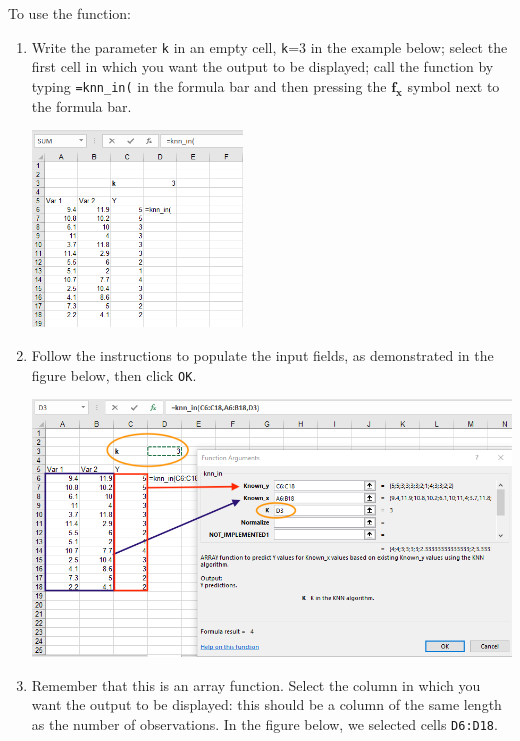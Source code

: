 \documentclass[12pt]{article}
\begin{document}
To use the function:
\begin{enumerate}
\item Write the parameter \texttt{k} in an empty cell, \texttt{k}=3 in the example below; select the first cell in which you want the output to be displayed; call the function by typing \texttt{=knn\_in(} in the formula bar and then pressing the $\boldsymbol{f_x}$ symbol next to the formula bar.

\medskip

\centerline{\includegraphics[width=2.2in]{figures/knnin1}}

\medskip

\item Follow the instructions to populate the input fields, as demonstrated in the figure below, then click \texttt{OK}.

\medskip

\centerline{\includegraphics[width=5.5in]{figures/knnin2}}

\medskip

\item Remember that this is an array function. Select the column in which you want the output to be displayed: this should be a column of the same length as the number of observations. In the figure below, we selected cells \texttt{D6:D18}.

\medskip


\end{enumerate}
\end{document}
